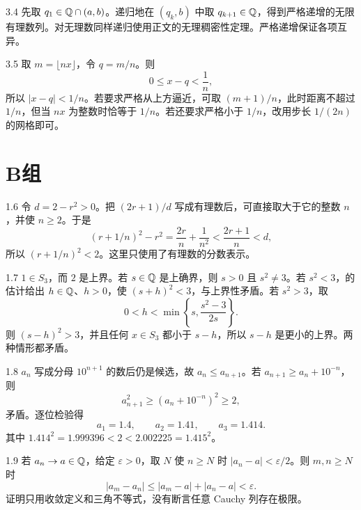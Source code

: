 \begin{solution}{3.4}
先取 \(q_1\in\mathbb{Q}\cap(a,b)\)。递归地在 \((q_k,b)\) 中取 \(q_{k+1}\in\mathbb{Q}\)，得到严格递增的无限有理数列。对无理数同样递归使用正文的无理稠密性定理。严格递增保证各项互异。
\end{solution}

\begin{solution}{3.5}
取 \(m=\lfloor nx\rfloor\)，令 \(q=m/n\)。则
\[
 0\le x-q<\frac1n,
\]
所以 \(|x-q|<1/n\)。若要求严格从上方逼近，可取 \((m+1)/n\)，此时距离不超过 \(1/n\)，但当 \(nx\) 为整数时恰等于 \(1/n\)。若还要求严格小于 \(1/n\)，改用步长 \(1/(2n)\) 的网格即可。
\end{solution}

\section*{B组}

\begin{solution}{1.6}
令 \(d=2-r^2>0\)。把 \((2r+1)/d\) 写成有理数后，可直接取大于它的整数 \(n\)，并使 \(n\ge2\)。于是
\[
 (r+1/n)^2-r^2=\frac{2r}{n}+\frac1{n^2}
 <\frac{2r+1}{n}<d,
\]
所以 \((r+1/n)^2<2\)。这里只使用了有理数的分数表示。
\end{solution}

\begin{solution}{1.7}
\(1\in S_3\)，而 \(2\) 是上界。若 \(s\in\mathbb{Q}\) 是上确界，则 \(s>0\) 且 \(s^2\ne3\)。若 \(s^2<3\)，的估计给出 \(h\in\mathbb{Q}\)、\(h>0\)，使 \((s+h)^2<3\)，与上界性矛盾。若 \(s^2>3\)，取
\[
 0<h<\min\left\{s,\frac{s^2-3}{2s}\right\}.
\]
则 \((s-h)^2>3\)，并且任何 \(x\in S_3\) 都小于 \(s-h\)，所以 \(s-h\) 是更小的上界。两种情形都矛盾。
\end{solution}

\begin{solution}{1.8}
\(a_n\) 写成分母 \(10^{n+1}\) 的数后仍是候选，故 \(a_n\le a_{n+1}\)。若 \(a_{n+1}\ge a_n+10^{-n}\)，则
\[
 a_{n+1}^2\ge(a_n+10^{-n})^2\ge2,
\]
矛盾。逐位检验得
\[
 a_1=1.4,\qquad a_2=1.41,\qquad a_3=1.414.
\]
其中 \(1.414^2=1.999396<2<2.002225=1.415^2\)。
\end{solution}

\begin{solution}{1.9}
若 \(a_n\to a\in\mathbb{Q}\)，给定 \(\varepsilon>0\)，取 \(N\) 使 \(n\ge N\) 时 \(|a_n-a|<\varepsilon/2\)。则 \(m,n\ge N\) 时
\[
 |a_m-a_n|\le|a_m-a|+|a_n-a|<\varepsilon.
\]
证明只用收敛定义和三角不等式，没有断言任意 Cauchy 列存在极限。
\end{solution}

